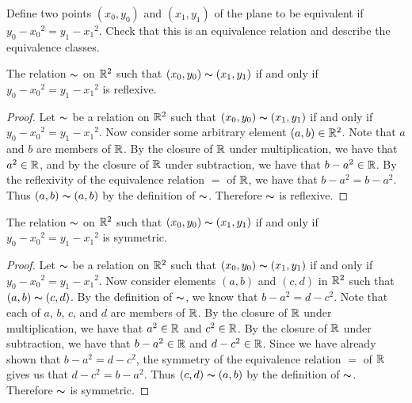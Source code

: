 \documentclass[../main.tex]{subfiles}
\begin{document}
\problem{}\label{s03p01}

Define two points \((x_0,y_0)\) and \((x_1,y_1)\) of the plane to be equivalent
if \(y_0 - {x_0}^2 = y_1 - {x_1}^2\). Check that this is an equivalence relation
and describe the equivalence classes.

\begin{thm}
	The relation \(\thicksim\) on \({\mathbb{R}}^2\) such that
	\(({x_0},{y_0})\thicksim({x_1},{y_1})\) if and only if
	\({y_0}-{{x_0}^2}={y_1}-{{x_1}^2}\) is reflexive.
\end{thm}
\begin{proof}
	Let \(\thicksim\) be a relation on \({\mathbb{R}}^2\) such that
	\(({x_0},{y_0})\thicksim({x_1},{y_1})\) if and only if
	\({y_0}-{{x_0}^2}={y_1}-{{x_1}^2}\). Now consider some arbitrary
	element \((a,b) \in {\mathbb{R}}^2\). Note that \(a\) and \(b\) are members
	of \(\mathbb{R}\). By the closure of \(\mathbb{R}\) under multiplication, we
	have that \({a}^2 \in \mathbb{R}\), and by the closure of \(\mathbb{R}\) under
	subtraction, we have that \(b-{{a}^2} \in \mathbb{R}\). By the reflexivity
	of the equivalence relation \(=\) of \(\mathbb{R}\), we have that
	\(b-{{a}^2} = b-{{a}^2}\). Thus \((a,b)\thicksim(a,b)\) by the
	definition of \(\thicksim\). Therefore \(\thicksim\) is reflexive.
\end{proof}

\begin{thm}
	The relation \(\thicksim\) on \({\mathbb{R}}^2\) such that
	\(({x_0},{y_0})\thicksim({x_1},{y_1})\) if and only if
	\({y_0}-{{x_0}^2}={y_1}-{{x_1}^2}\) is symmetric.
\end{thm}
\begin{proof}
	Let \(\thicksim\) be a relation on \({\mathbb{R}}^2\) such that
	\(({x_0},{y_0}) \thicksim ({x_1},{y_1})\) if and only if
	\({y_0} - {{x_0}^2} = {y_1} - {{x_1}^2}\). Now consider elements
	\((a,b)\) and \((c,d)\) in \({\mathbb{R}}^2\) such that
	\((a,b) \thicksim (c,d)\). By the definition of \(\thicksim\), we know
	that \(b - {{a}^2} = d - {{c}^2}\). Note that each of \(a\), \(b\),
	\(c\), and \(d\) are members of \(\mathbb{R}\). By the closure of \(\mathbb{R}\)
	under multiplication, we have that \({a}^2 \in \mathbb{R}\) and
	\({c}^2 \in \mathbb{R}\). By the closure of \(\mathbb{R}\) under subtraction,
	we have that \(b-{{a}^2} \in \mathbb{R}\) and \(d-{{c}^2} \in \mathbb{R}\).
	Since we have already shown that \(b - {{a}^2} = d - {{c}^2}\), the
	symmetry of the equivalence relation \(=\) of \(\mathbb{R}\) gives us that
	\(d-{{c}^2} = b-{{a}^2}\). Thus \((c,d)\thicksim(a,b)\) by the
	definition of \(\thicksim\). Therefore \(\thicksim\) is symmetric.
\end{proof}
\end{document}
